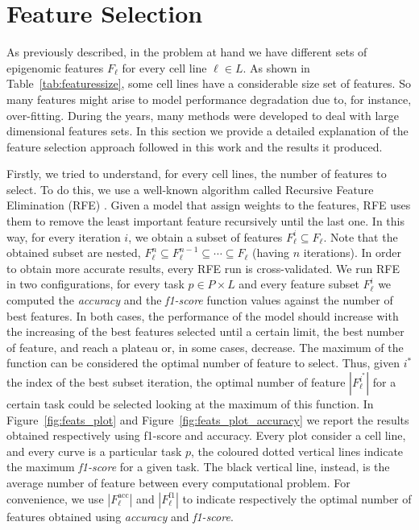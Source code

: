 \section{Feature Selection} \label{sec:featureselection}
As previously described, in the problem at hand we have different sets of epigenomic features $F_\ell$ for every cell line $\ell \in L$. As shown in Table~\ref{tab:featuressize}, some cell lines have a considerable size set of features. So many features might arise to model performance degradation due to, for instance, over-fitting. During the years, many methods were developed to deal with large dimensional features sets. In this section we provide a detailed explanation of the feature selection approach followed in this work and the results it produced. 

Firstly, we tried to understand, for every cell lines, the number of features to select. To do this, we use a well-known algorithm called Recursive Feature Elimination (RFE) \cite{VapnikRFE}. Given a model that assign weights to the features, RFE uses them to remove the least important feature recursively until the last one. In this way, for every iteration $i$, we obtain a subset of features $F_{\ell}^{i} \subseteq F_\ell$. Note that the obtained subset are nested, $F_{\ell}^{n}  \subseteq  F_{\ell}^{n-1} \subseteq \cdots \subseteq F_{\ell}$ (having $n$ iterations). In order to obtain more accurate results, every RFE run is cross-validated. We run RFE in two configurations, for every task $p \in P \times L$ and every feature subset $F_\ell^i$ we computed the \emph{accuracy} and the \emph{f1-score} function values against the number of best features. In both cases, the performance of the model should increase with the increasing of the best features selected until a certain limit, the best number of feature, and reach a plateau or, in some cases, decrease. The maximum of the function can be considered the optimal number of feature to select. Thus, given $i^{*}$ the index of the best subset iteration, the optimal number of feature $|F_\ell^{i^{*}}|$ for a certain task could be selected looking at the maximum of this function. In Figure~\ref{fig:feats_plot} and Figure~\ref{fig:feats_plot_accuracy} we report the results obtained respectively using f1-score and accuracy. Every plot consider a cell line, and every curve is a particular task $p$, the coloured dotted vertical lines indicate the maximum \emph{f1-score} for a given task. The black vertical line, instead, is the average number of feature between every computational problem. For convenience, we use $|F_\ell^{\textrm{acc}}|$ and $|F_\ell^{\textrm{f1}}|$ to indicate respectively the optimal number of features obtained using \emph{accuracy} and \emph{f1-score}.

